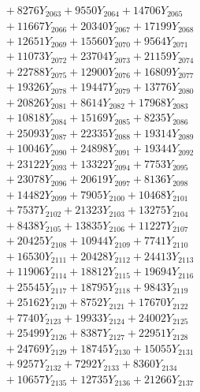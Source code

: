 \documentclass[a4paper,10pt]{article}
\begin{document}
{\begin{align}
&\;  + 8276 Y_{2063} + 9550 Y_{2064} + 14706 Y_{2065} \\[0.3ex]
&\;  + 11667 Y_{2066} + 20340 Y_{2067} + 17199 Y_{2068} \\[0.5ex]\allowbreak
&\;  + 12651 Y_{2069} + 15560 Y_{2070} + 9564 Y_{2071} \\[0.3ex]
&\;  + 11073 Y_{2072} + 23704 Y_{2073} + 21159 Y_{2074} \\[0.3ex]
&\;  + 22788 Y_{2075} + 12900 Y_{2076} + 16809 Y_{2077} \\[0.3ex]
&\;  + 19326 Y_{2078} + 19447 Y_{2079} + 13776 Y_{2080} \\[0.3ex]
&\;  + 20826 Y_{2081} + 8614 Y_{2082} + 17968 Y_{2083} \\[0.3ex]
&\;  + 10818 Y_{2084} + 15169 Y_{2085} + 8235 Y_{2086} \\[0.3ex]
&\;  + 25093 Y_{2087} + 22335 Y_{2088} + 19314 Y_{2089} \\[0.3ex]
&\;  + 10046 Y_{2090} + 24898 Y_{2091} + 19344 Y_{2092} \\[0.3ex]
&\;  + 23122 Y_{2093} + 13322 Y_{2094} + 7753 Y_{2095} \\[0.3ex]
&\;  + 23078 Y_{2096} + 20619 Y_{2097} + 8136 Y_{2098} \\[0.5ex]\allowbreak
&\;  + 14482 Y_{2099} + 7905 Y_{2100} + 10468 Y_{2101} \\[0.3ex]
&\;  + 7537 Y_{2102} + 21323 Y_{2103} + 13275 Y_{2104} \\[0.3ex]
&\;  + 8438 Y_{2105} + 13835 Y_{2106} + 11227 Y_{2107} \\[0.3ex]
&\;  + 20425 Y_{2108} + 10944 Y_{2109} + 7741 Y_{2110} \\[0.3ex]
&\;  + 16530 Y_{2111} + 20428 Y_{2112} + 24413 Y_{2113} \\[0.3ex]
&\;  + 11906 Y_{2114} + 18812 Y_{2115} + 19694 Y_{2116} \\[0.3ex]
&\;  + 25545 Y_{2117} + 18795 Y_{2118} + 9843 Y_{2119} \\[0.3ex]
&\;  + 25162 Y_{2120} + 8752 Y_{2121} + 17670 Y_{2122} \\[0.3ex]
&\;  + 7740 Y_{2123} + 19933 Y_{2124} + 24002 Y_{2125} \\[0.3ex]
&\;  + 25499 Y_{2126} + 8387 Y_{2127} + 22951 Y_{2128} \\[0.5ex]\allowbreak
&\;  + 24769 Y_{2129} + 18745 Y_{2130} + 15055 Y_{2131} \\[0.3ex]
&\;  + 9257 Y_{2132} + 7292 Y_{2133} + 8360 Y_{2134} \\[0.3ex]
&\;  + 10657 Y_{2135} + 12735 Y_{2136} + 21266 Y_{2137} \\[0.3ex]

\end{align}}
\end{document}
